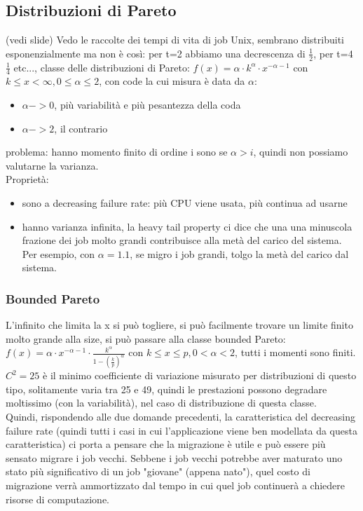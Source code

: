 \documentclass{article}
\begin{document}
\subsection{Distribuzioni di Pareto}
(vedi slide)
Vedo le raccolte dei tempi di vita di job Unix, sembrano distribuiti esponenzialmente ma non è così: per t=2 abbiamo una decrescenza di $\frac{1}{2}$, per t=4 $\frac{1}{4}$ etc..., classe delle distribuzioni di Pareto: $f(x) = \alpha \cdot k^{\alpha} \cdot x^{-\alpha-1}$ con $k \leq x < \infty, 0 \leq \alpha \leq 2$, con code la cui misura è data da $\alpha$:
\begin{itemize}
\item $\alpha -> 0$, più variabilità e più pesantezza della coda
\item $\alpha -> 2$, il contrario
\end{itemize}
problema: hanno momento finito di ordine i sono se $\alpha > i$, quindi non possiamo valutarne la varianza.\\ Proprietà:
\begin{itemize}
\item sono a decreasing failure rate: più CPU viene usata, più continua ad usarne
\item hanno varianza infinita, la heavy tail property ci dice che una una minuscola frazione dei job molto grandi contribuisce alla metà del carico del sistema. Per esempio, con $\alpha = 1.1$, se migro i job grandi, tolgo la metà del carico dal sistema.
\end{itemize}
\subsubsection{Bounded Pareto}
L'infinito che limita la x si può togliere, si può facilmente trovare un limite finito molto grande alla size, si può passare alla classe bounded Pareto: $f(x) = \alpha \cdot x^{-\alpha - 1} \cdot \frac{k^{\alpha}}{1 - (\frac{k}{p})^{\alpha}}$ con $k \leq x \leq p, 0 < \alpha < 2$, tutti i momenti sono finiti.\\ $C^2 = 25$ è il minimo coefficiente di variazione misurato per distribuzioni di questo tipo, solitamente varia tra 25 e 49, quindi le prestazioni possono degradare moltissimo (con la variabilità), nel caso di distribuzione di questa classe.\\ Quindi, rispondendo alle due domande precedenti, la caratteristica del decreasing failure rate (quindi tutti i casi in cui l'applicazione viene ben modellata da questa caratteristica) ci porta a pensare che la migrazione è utile e può essere più sensato migrare i job vecchi. Sebbene i job vecchi potrebbe aver maturato uno stato più significativo di un job "giovane" (appena nato"), quel costo di migrazione verrà ammortizzato dal tempo in cui quel job continuerà a chiedere risorse di computazione.
\end{document}
